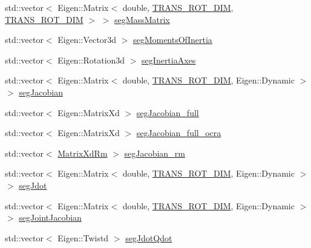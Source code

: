 \begin{DoxyCompactItemize}
\item 
std\+::vector$<$ Eigen\+::\+Matrix$<$ double, \hyperlink{OcraWbiModel_8cpp_ab4a87cb824ceff256c6b8bce7701af58}{T\+R\+A\+N\+S\+\_\+\+R\+O\+T\+\_\+\+D\+IM}, \hyperlink{OcraWbiModel_8cpp_ab4a87cb824ceff256c6b8bce7701af58}{T\+R\+A\+N\+S\+\_\+\+R\+O\+T\+\_\+\+D\+IM} $>$ $>$ \hyperlink{structOcraWbiModel_1_1OcraWbiModel__pimpl_a3d0cb4cfda4c6ce54020d61f5845dedb}{seg\+Mass\+Matrix}
\item 
std\+::vector$<$ Eigen\+::\+Vector3d $>$ \hyperlink{structOcraWbiModel_1_1OcraWbiModel__pimpl_a478fcde74e00dc9b8235bbe5a2c2cb75}{seg\+Moments\+Of\+Inertia}
\item 
std\+::vector$<$ Eigen\+::\+Rotation3d $>$ \hyperlink{structOcraWbiModel_1_1OcraWbiModel__pimpl_aba2d3ed2e0c2a1a1b8b4d40c3df6a4a5}{seg\+Inertia\+Axes}
\item 
std\+::vector$<$ Eigen\+::\+Matrix$<$ double, \hyperlink{OcraWbiModel_8cpp_ab4a87cb824ceff256c6b8bce7701af58}{T\+R\+A\+N\+S\+\_\+\+R\+O\+T\+\_\+\+D\+IM}, Eigen\+::\+Dynamic $>$ $>$ \hyperlink{structOcraWbiModel_1_1OcraWbiModel__pimpl_a3430097cc1a200a4ff5abcafd52a7d44}{seg\+Jacobian}
\item 
std\+::vector$<$ Eigen\+::\+Matrix\+Xd $>$ \hyperlink{structOcraWbiModel_1_1OcraWbiModel__pimpl_abdfc807c93bad49781c9ad0f1588b203}{seg\+Jacobian\+\_\+full}
\item 
std\+::vector$<$ Eigen\+::\+Matrix\+Xd $>$ \hyperlink{structOcraWbiModel_1_1OcraWbiModel__pimpl_ad4acb4942706d77c1dfd480132592ded}{seg\+Jacobian\+\_\+full\+\_\+ocra}
\item 
std\+::vector$<$ \hyperlink{namespaceocra__icub_aa5e36a19ed031c28ca83c207bd7dd83f}{Matrix\+Xd\+Rm} $>$ \hyperlink{structOcraWbiModel_1_1OcraWbiModel__pimpl_a08c7db0bf6de072dc07a5810311aba48}{seg\+Jacobian\+\_\+rm}
\item 
std\+::vector$<$ Eigen\+::\+Matrix$<$ double, \hyperlink{OcraWbiModel_8cpp_ab4a87cb824ceff256c6b8bce7701af58}{T\+R\+A\+N\+S\+\_\+\+R\+O\+T\+\_\+\+D\+IM}, Eigen\+::\+Dynamic $>$ $>$ \hyperlink{structOcraWbiModel_1_1OcraWbiModel__pimpl_ab0371f4015f7abdf795636003e302de1}{seg\+Jdot}
\item 
std\+::vector$<$ Eigen\+::\+Matrix$<$ double, \hyperlink{OcraWbiModel_8cpp_ab4a87cb824ceff256c6b8bce7701af58}{T\+R\+A\+N\+S\+\_\+\+R\+O\+T\+\_\+\+D\+IM}, Eigen\+::\+Dynamic $>$ $>$ \hyperlink{structOcraWbiModel_1_1OcraWbiModel__pimpl_a4e1b970fc381b8c93bb41e4b3854986c}{seg\+Joint\+Jacobian}
\item 
std\+::vector$<$ Eigen\+::\+Twistd $>$ \hyperlink{structOcraWbiModel_1_1OcraWbiModel__pimpl_aa8c16d833a534ce9975a10202aa145a3}{seg\+Jdot\+Qdot}

\end{DoxyCompactItemize}
